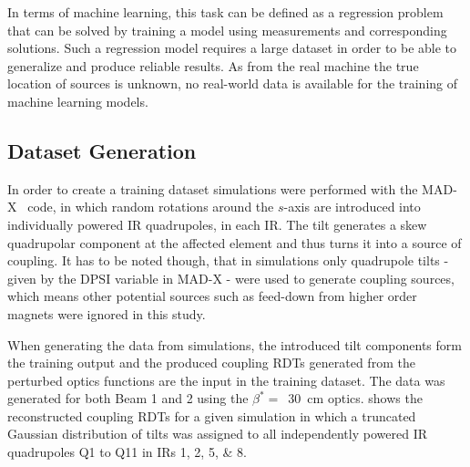 In terms of machine learning, this task can be defined as a regression problem that can be solved by training a model using measurements and corresponding solutions.
Such a regression model requires a large dataset in order to be able to generalize and produce reliable results.
As from the real machine the true location of sources is unknown, no real-world data is available for the training of machine learning models.

\subsection{Dataset Generation}

In order to create a training dataset simulations were performed with the MAD-X~\cite{CODE:MADX_guide} code, in which random rotations around the \(s\)-axis are introduced into individually powered IR quadrupoles, in each IR.
The tilt generates a skew quadrupolar component at the affected element and thus turns it into a source of coupling.
It has to be noted though, that in simulations only quadrupole tilts - given by the \(\mathrm{DPSI}\) variable in MAD-X - were used to generate coupling sources, which means other potential sources such as feed-down from higher order magnets were ignored in this study.

When generating the data from simulations, the introduced tilt components form the training output and the produced coupling RDTs generated from the perturbed optics functions are the input in the training dataset.
The data was generated for both Beam 1 and 2 using the \(\beta^{\ast}=\)~\qty{30}{\centi\meter} optics.
 shows the reconstructed coupling RDTs for a given simulation in which a truncated Gaussian distribution of tilts was assigned to all independently powered IR quadrupoles Q\num{1} to Q\num{11} in IRs \numlist{1;2;5;8}.


